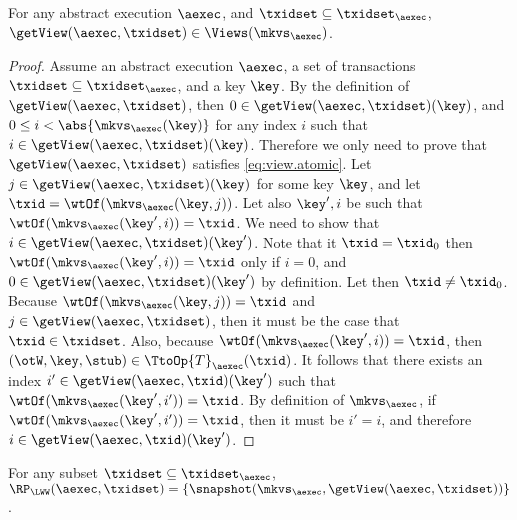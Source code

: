 \begin{proposition}
\label{prop:getview.valid}
For any abstract execution $\aexec$, and $\txidset \subseteq \txidset_{\aexec}$, 
$\getView(\aexec, \txidset) \in \Views(\mkvs_{\aexec})$.
\end{proposition}
\begin{proof}
Assume an abstract execution $\aexec$, a set of transactions $\txidset \subseteq \txidset_{\aexec}$, and a key \( \key \).
By the definition of $\getView(\aexec, \txidset)$, 
then $0 \in \getView(\aexec, \txidset)(\key)$, and 
$0 \leq i < \abs{ \mkvs_{\aexec}(\key) }$ for any index \( i \) such that $i \in \getView(\aexec, \txidset)(\key)$.
Therefore we only need to prove that $\getView(\aexec, \txidset)$ satisfies \eqref{eq:view.atomic}.
Let $j \in \getView(\aexec, \txidset)(\key)$ for some key $\key$, and let $\txid = 
\wtOf(\mkvs_{\aexec}(\key, j))$. Let also $\key', i$ be such that 
$\wtOf(\mkvs_{\aexec}(\key', i)) = \txid$. We need to show that 
$i \in \getView(\aexec, \txidset)(\key')$. Note that it $\txid = \txid_{0}$ 
then $\wtOf(\mkvs_{\aexec}(\key', i)) = \txid$ only if $i = 0$, and 
$0 \in \getView(\aexec, \txidset)(\key')$ by definition. 
Let then $\txid \neq \txid_{0}$. Because $\wtOf(\mkvs_{\aexec}(\key, j)) = \txid$ 
and $j \in \getView(\aexec, \txidset)$, then it must be the case that $\txid \in \txidset$. 
Also, because $\wtOf(\mkvs_{\aexec}(\key', i)) = \txid$, then $(\otW, \key, \stub) \in 
\TtoOp{T}_{\aexec}(\txid)$. It follows that there exists an index $i' \in \getView(\aexec, \txid)(\key')$ 
such that $\wtOf(\mkvs_{\aexec}(\key', i')) = \txid$. By definition of 
$\mkvs_{\aexec}$, if $\wtOf(\mkvs_{\aexec}(\key', i')) = \txid$, then it must 
be $i' = i$, and therefore $i \in \getView(\aexec, \txid)(\key')$.
\end{proof}


\begin{proposition}
\label{prop:compatible.aexec2kv}
For any subset $\txidset \subseteq \txidset_{\aexec}$, $\RP_{\LWW}(\aexec, \txidset) = \{\snapshot(\mkvs_{\aexec}, \getView(\aexec, \txidset))\}$.
\end{proposition}

